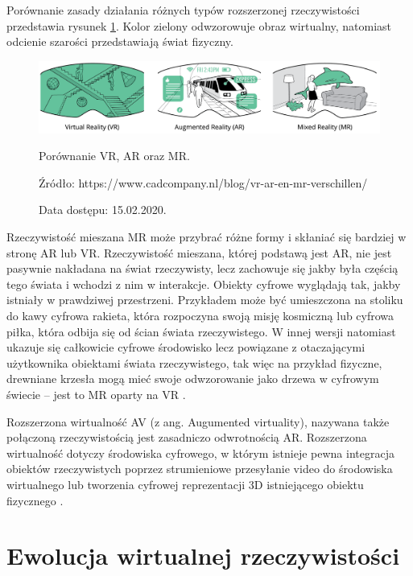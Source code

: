 Porównanie zasady działania różnych typów rozszerzonej rzeczywistości przedstawia rysunek \ref{fig:vr-ar-mr}. Kolor zielony odwzorowuje obraz wirtualny, natomiast odcienie szarości przedstawiają świat fizyczny.


\begin{figure}[ht]
	\centering
	\includegraphics[width=1\textwidth]{images/1.xr-comparision.png}
	\caption{Porównanie VR, AR oraz MR.}
	\caption*{Źródło: https://www.cadcompany.nl/blog/vr-ar-en-mr-verschillen/}
	\caption*{Data dostępu: 15.02.2020.}
	\label{fig:vr-ar-mr}
\end{figure}

Rzeczywistość mieszana MR może przybrać różne formy i skłaniać się bardziej w stronę AR lub VR. Rzeczywistość mieszana, której podstawą jest AR, nie jest pasywnie nakładana na świat rzeczywisty, lecz zachowuje się jakby była częścią tego świata i wchodzi z nim w interakcje. Obiekty cyfrowe wyglądają tak, jakby istniały w prawdziwej przestrzeni. Przykładem może być umieszczona na stoliku do kawy cyfrowa rakieta, która rozpoczyna swoją misję kosmiczną lub cyfrowa piłka, która odbija się od ścian świata rzeczywistego. W innej wersji natomiast ukazuje się całkowicie cyfrowe środowisko lecz powiązane z otaczającymi użytkownika obiektami świata rzeczywistego, tak więc na przykład fizyczne, drewniane krzesła mogą mieć swoje odwzorowanie jako drzewa w cyfrowym świecie – jest to MR oparty na VR \citep{virtualfor}.

Rozszerzona wirtualność AV (z ang. Augumented virtuality), nazywana także połączoną rzeczywistością jest zasadniczo odwrotnością AR. Rozszerzona wirtualność dotyczy środowiska cyfrowego, w którym istnieje pewna integracja obiektów rzeczywistych poprzez strumieniowe przesyłanie video do środowiska wirtualnego lub tworzenia cyfrowej reprezentacji 3D istniejącego obiektu fizycznego \citep{virtualfor}.



\section{Ewolucja wirtualnej rzeczywistości}



